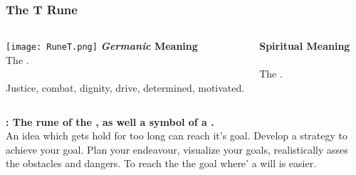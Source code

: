 \begin{frame}
\frametitle{The T Rune}
\begin{columns}[c] %

\texttt{[image: RuneT.png]}
\textbf{\textit{Germanic} Meaning}\\
The . \\
\\
Justice, combat, dignity, drive, determined, motivated.

\textbf{Spiritual Meaning}\\
\\

The .
\end{columns}

\vspace{5mm}
\textbf{: The rune of the , as well a symbol of a .}\\
An idea which gets hold for too long can reach it's goal. Develop a strategy to achieve your goal. Plan your endeavour, visualize your goals, realistically asses the obstacles and  dangers. To reach the the goal where' a will is easier.
\end{frame}

